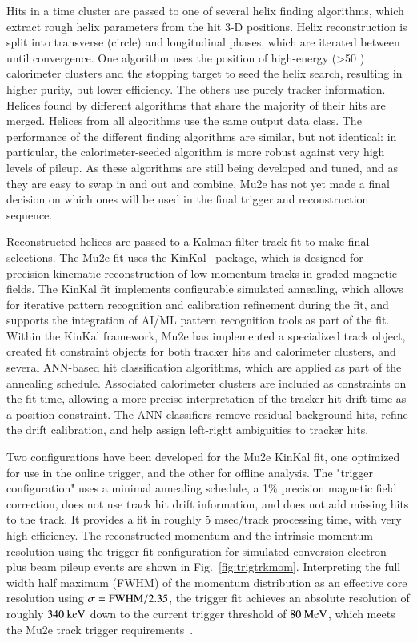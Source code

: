 Hits in a time cluster are passed to one of several helix finding algorithms, which extract rough helix parameters from the hit 3-D positions. Helix reconstruction is split into transverse (circle) and longitudinal phases, which are iterated between until convergence. One algorithm uses the position of high-energy (>50 \MeV) calorimeter clusters and the stopping target to seed the helix search, resulting in higher purity, but lower efficiency. The others use purely tracker information. Helices found by different algorithms that share the majority of their hits are merged. Helices from all algorithms use the same output data class. The performance of the different finding algorithms are similar, but not identical: in particular, the calorimeter-seeded algorithm is more robust against very high levels of pileup. As these algorithms are still being developed and tuned, and as they are easy to swap in and out and combine, Mu2e has not yet made a final decision on which ones will be used in the final trigger and reconstruction sequence.

Reconstructed helices are passed to a Kalman filter track fit to make final selections. The Mu2e fit uses the KinKal~\cite{Brown:2024tur} package, which is designed for precision kinematic reconstruction of low-momentum tracks in graded magnetic fields. The KinKal fit implements configurable simulated annealing, which allows for iterative pattern recognition and calibration refinement during the fit, and supports the integration of AI/ML pattern recognition tools as part of the fit. Within the KinKal framework, Mu2e has implemented a specialized track object, created fit constraint objects for both tracker hits and calorimeter clusters, and several ANN-based hit classification algorithms, which are applied as part of the annealing schedule. Associated calorimeter clusters are included as constraints on the fit time, allowing a more precise interpretation of the tracker hit drift time as a position constraint. The ANN classifiers remove residual background hits, refine the drift calibration, and help assign left-right ambiguities to tracker hits. 

Two configurations have been developed for the Mu2e KinKal fit, one optimized for use in the online trigger, and the other for offline analysis. The "trigger configuration" uses a minimal annealing schedule, a 1\% precision magnetic field correction, does not use track hit drift information, and does not add missing hits to the track. It provides a fit in roughly 5 msec/track processing time, with very high efficiency. The reconstructed momentum and the intrinsic momentum resolution using the trigger fit configuration for simulated conversion electron plus beam pileup events are shown in Fig.~\ref{fig:trigtrkmom}. Interpreting the full width half maximum (FWHM) of the momentum distribution as an effective core resolution using $\sigma = \rm FWHM/2.35$, the trigger fit achieves an absolute resolution of roughly $340 ~\mbox{keV}$ down to the current trigger threshold of $80 ~\mbox{MeV}$, which meets the Mu2e track trigger requirements~\cite{triggerreqs}.

